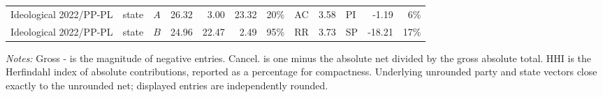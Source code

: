 \begin{landscape}
\begin{longtable}{L{4.3cm}llrrrrL{2.0cm}rL{2.0cm}rr}
Ideological 2022/PP-PL & state & \(A\) & 26.32 & 3.00 & 23.32 & 20\% & AC & 3.58 & PI & -1.19 & 6\% \\
Ideological 2022/PP-PL & state & \(B\) & 24.96 & 22.47 & 2.49 & 95\% & RR & 3.73 & SP & -18.21 & 17\% \\
\end{longtable}
\noindent\footnotesize\textit{Notes:} Gross - is the magnitude of negative entries. Cancel. is one minus the absolute net divided by the gross absolute total. HHI is the Herfindahl index of absolute contributions, reported as a percentage for compactness. Underlying unrounded party and state vectors close exactly to the unrounded net; displayed entries are independently rounded.
\endgroup
\end{landscape}
